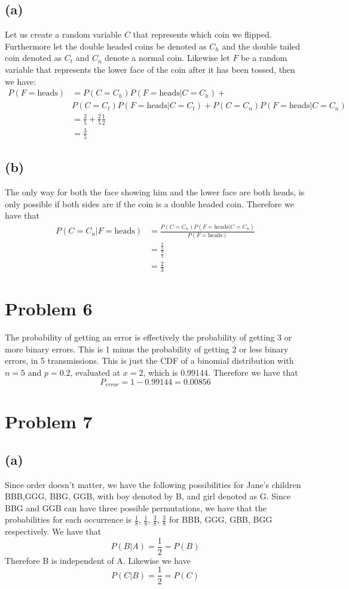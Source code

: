 \subsection*{(a)}
Let us create a random variable $C$ that represents which coin we flipped. Furthermore let the double headed coins be denoted as $C_h$ and the double tailed coin denoted as $C_t$
and $C_n$ denote a normal coin. Likewise let $F$ be a random variable that represents the lower face of the coin after it has been tossed, then we have:
\begin{align*}
    P(F=\text{heads})&=P(C=C_h)P(F=\text{heads}|C=C_h)+\\&P(C=C_t)P(F=\text{heads}|C=C_t)+P(C=C_n)P(F=\text{heads}|C=C_n)\\
    &=\frac{2}{5}+\frac{2}{5}\frac{1}{2}\\
    &=\boxed{\frac{3}{5}}
\end{align*}
\subsection*{(b)}
The only way for both the face showing him and the lower face are both heads, is only possible if both 
sides are if the coin is a double headed coin. Therefore we have that
\begin{align*}
    P(C=C_n|F=\text{heads})&=\frac{P(C=C_n)P(F=\text{heads}|C=C_n)}{P(F=\text{heads})}\\
    &=\frac{\frac{2}{5}}{\frac{3}{5}}\\
    &=\boxed{\frac{2}{3}}
\end{align*}
\section*{Problem 6}
The probability of getting an error is effectively the probability of getting 
3 or more binary errors. This is 1 minus the probability of getting 2 or less binary errors, in 5 transmissions. 
This is just the CDF of a binomial distribution with $n=5$ and $p=0.2$, evaluated at $x=2$, which is $0.99144$. Therefore we have that
$$P_{error}=1-0.99144=\boxed{0.00856}$$
\section*{Problem 7}
\subsection*{(a)}
Since order doesn't matter, we have the following possibilities for Jane's children
BBB,GGG, BBG, GGB, with boy denoted by B, and girl denoted as G. Since 
BBG and GGB can have three possible permutations, we have that the probabilities for each occurrence
is $\frac{1}{8}$, $\frac{1}{8}$, $\frac{3}{8}$, $\frac{3}{8}$ for BBB, GGG, GBB, BGG respectively. 
We have that
$$P(B|A)=\frac{1}{2}=P(B)$$
Therefore B is independent of A. Likewise we have
$$P(C|B)=\frac{1}{2}=P(C)$$
